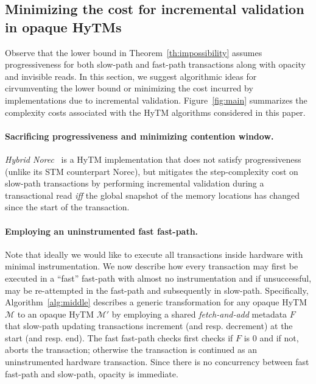 \subsection{Minimizing the cost for incremental validation in opaque HyTMs}
\label{sec:middlepath}
%
%
Observe that the lower bound in Theorem~\ref{th:impossibility} assumes progressiveness for both slow-path and fast-path transactions
along with opacity and invisible reads.
In this section, we suggest algorithmic ideas for cirvumventing the lower bound or minimizing the cost incurred
by implementations due to incremental validation. Figure~\ref{fig:main} summarizes the complexity costs
associated with the HyTM algorithms considered in this paper.

\paragraph{Sacrificing progressiveness and minimizing contention window.}
%
\emph{Hybrid Norec}~\cite{hybridnorec} is a HyTM implementation that does not satisfy progressiveness
(unlike its STM counterpart Norec), but mitigates
the step-complexity cost on slow-path transactions by performing incremental validation 
during a transactional read \emph{iff} 
the global snapshot of the memory locations has changed since the start of the transaction.
%
%

\paragraph{Employing an uninstrumented fast fast-path.}
Note that ideally we would like to execute all transactions inside hardware with minimal instrumentation.
We now describe how every transaction may first be executed in a ``fast'' fast-path with almost no instrumentation
and if unsuccessful, may be re-attempted in the fast-path and subsequently in slow-path.
Specifically, Algorithm~\ref{alg:middle} describes a generic transformation for any opaque HyTM $\mathcal{M}$ to an opaque
HyTM $\mathcal{M}'$ by employing a shared \emph{fetch-and-add} metadata $F$ that slow-path updating transactions
increment (and resp. decrement) at the start (and resp. end). The fast fast-path checks first checks if $F$ is $0$
and if not, aborts the transaction; otherwise the transaction is continued as an uninstrumented hardware transaction.
Since there is no concurrency between fast fast-path and slow-path, opacity is immediate.
%
%

%